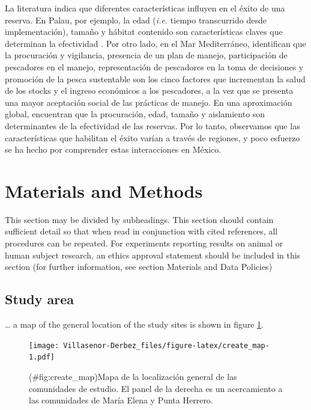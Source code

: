 \documentclass{frontiersSCNS}
\begin{document}
La literatura indica que diferentes características influyen en el éxito
de una reserva. En Palau, por ejemplo, la edad (\emph{i.e.} tiempo
transcurrido desde implementación), tamaño y hábitat contenido son
características claves que determinan la efectividad
\citep{friedlander_2017-oI}. Por otro lado, en el Mar Mediterráneo,
\citet{difranco_2016-Xw} identifican que la procuración y vigilancia,
presencia de un plan de manejo, participación de pescadores en el
manejo, representación de pescadores en la toma de decisiones y
promoción de la pesca sustentable son los cinco factores que incrementan
la salud de los stocks y el ingreso económicos a los pescadores, a la
vez que se presenta una mayor aceptación social de las prácticas de
manejo. En una aproximación global, \citet{edgar_2014-UO} encuentran que
la procuración, edad, tamaño y aislamiento son determinantes de la
efectividad de las reservas. Por lo tanto, observamos que las
características que habilitan el éxito varían a través de regiones, y
poco esfuerzo se ha hecho por comprender estas interacciones en México.

\section{Materials and Methods}\label{materials-and-methods}

This section may be divided by subheadings. This section should contain
sufficient detail so that when read in conjunction with cited
references, all procedures can be repeated. For experiments reporting
results on animal or human subject research, an ethics approval
statement should be included in this section (for further information,
see section Materials and Data Policies)

\subsection{Study area}\label{study-area}

\ldots{} a map of the general location of the study sites is shown in
figure \ref{fig:map}.

\begin{figure}
\centering
\texttt{[image: Villasenor-Derbez\_files/figure-latex/create\_map-1.pdf]}
\caption{(\#fig:create\_map)\label{fig:map}Mapa de la localización
general de las comunidades de estudio. El panel de la derecha es un
acercamiento a las comunidades de María Elena y Punta Herrero.}
\end{figure}
\end{document}
